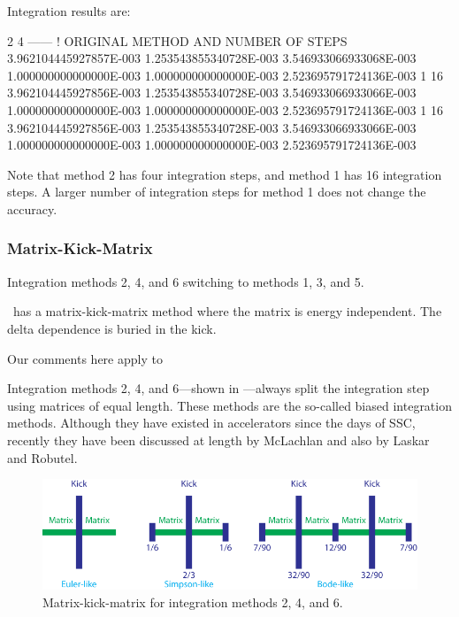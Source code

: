 Integration results are:

\begin{ptccode}
     2      4      ------ ! ORIGINAL METHOD AND NUMBER OF STEPS
3.962104445927857E-003  1.253543855340728E-003  3.546933066933068E-003
1.000000000000000E-003  1.000000000000000E-003  2.523695791724136E-003
     1     16
3.962104445927856E-003  1.253543855340728E-003  3.546933066933066E-003
1.000000000000000E-003  1.000000000000000E-003  2.523695791724136E-003
     1     16
3.962104445927856E-003  1.253543855340728E-003  3.546933066933066E-003
1.000000000000000E-003  1.000000000000000E-003  2.523695791724136E-003
\end{ptccode}

Note that method 2 has four integration steps, and method 1 has 16 integration steps.
A larger number of integration steps for method 1 does not change the accuracy.


\subsubsection{Matrix-Kick-Matrix}
\label{sub:Matrix-Kick-Matrix}

%
Integration methods 2, 4, and 6 switching to methods 1, 3, and 5.


\PTC\ has a matrix-kick-matrix method where the matrix is energy independent.
The delta dependence is buried in the kick.

Our comments here apply to 

Integration methods 2, 4, and 6---shown in ---always
split the integration step using matrices of equal length. These methods are the so-called
biased integration methods. Although they have existed in accelerators since the days of
SSC, recently they have been discussed at length by McLachlan and also by Laskar and
Robutel.


\begin{figure}[ht]
  \centering
  \includegraphics{illustrations/recutMKM}
  \caption{Matrix-kick-matrix for integration methods 2, 4, and 6.}
  \label{fig:Matrix-kick-matrix}
\end{figure}

